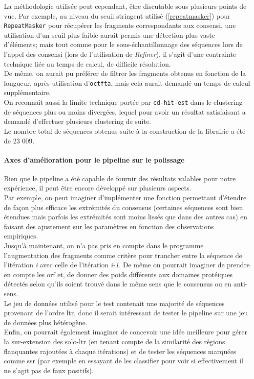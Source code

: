 \documentclass[10pt]{article}
\begin{document}
La méthodologie utilisée peut cependant, être discutable sous plusieurs points de vue. Par exemple, au niveau du seuil stringent utilisé (\autoref{repeatmasker}) pour \texttt{RepeatMasker} pour récupérer les fragments correspondants aux consensi, une utilisation d'un seuil plus faible aurait permis une détection plus vaste d'éléments; mais tout comme pour le sous-échantillonnage des séquences lors de l'appel des consensi (lors de l'utilisation de \textit{Refiner}), il s'agit d'une contrainte technique liée au temps de calcul, de difficile résolution. \\
De même, on aurait pu préférer de filtrer les fragments obtenus en fonction de la longueur, après utilisation d'\texttt{\acrshort{octfta}}, mais cela aurait demandé un temps de calcul supplémentaire. \\
On reconnaît aussi la limite technique portée par \texttt{cd-hit-est} dans le clustering de séquences plus ou moins divergées, lequel pour avoir un résultat satisfaisant a demandé d'effectuer plusieurs clustering de suite. \\
Le nombre total de séquences obtenus suite à la construction de la librairie a été de 23 009. \\


\paragraph{Axes d'amélioration pour le pipeline sur le polissage} Bien que le pipeline a été capable de fournir des résultats valables pour notre expérience, il peut être encore développé sur plusieurs aspects. \\
Par exemple, on peut imaginer d'implémenter une fonction permettant d'étendre de façon plus efficace les extrémités du consensus (certaines séquences sont bien étendues mais parfois les extrémités sont moins \og lissés \fg{} que dans des autres cas) en faisant des ajustement sur les paramètres en fonction des observations empiriques. \\
Jusqu'à maintenant, on n'a pas pris en compte dans le programme l'augmentation des fragments comme critère pour trancher entre la séquence de l'itération \textit{i} avec celle de l'itération \textit{i-1}. De même on pourrait imaginer de prendre en compte les \acrshort{orf} et, de donner des poids différents aux domaines protéiques détectés selon qu'ils soient trouvé dans le même sens que le consensus ou en anti-sens.  \\
Le jeu de données utilisé pour le test contenait une majorité de séquences provenant de l'ordre \acrshort{ltr}, donc il serait intéressant de tester le pipeline sur une jeu de données plus hétérogène. \\
Enfin, on pourrait également imaginer de concevoir une idée meilleure pour gérer la sur-extension des solo-\acrshort{ltr} (en tenant compte de la similarité des régions flanquantes rajoutées à chaque itérations) et de tester les séquences marquées comme \acrshort{ssr} (par exemple en essayant de les classifier pour voir si effectivement il ne s'agit pas de faux positifs). \\
\end{document}
